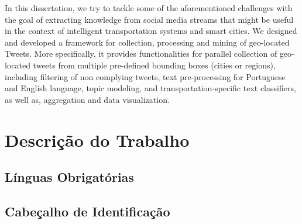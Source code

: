 \documentclass[9pt,a4paper]{extarticle}
\begin{document}
\begin{multicols}{2}
In this dissertation, we try to tackle some of the aforementioned challenges with the goal of extracting knowledge from social media streams that might be useful in the context of intelligent transportation systems and smart cities. We designed and developed a framework for collection, processing and mining of geo-located Tweets. More specifically, it provides functionalities for parallel collection of geo-located tweets from multiple pre-defined bounding boxes (cities or regions), including filtering of non complying tweets, text pre-processing for Portuguese and English language, topic modeling, and transportation-specific text classifiers, as well as, aggregation and data visualization.

\section{Descrição do Trabalho}\label{sec:work}



\subsection{Línguas Obrigatórias}\label{sec:lingua}


\subsection{Cabeçalho de Identificação}



\end{multicols}
\end{document}
